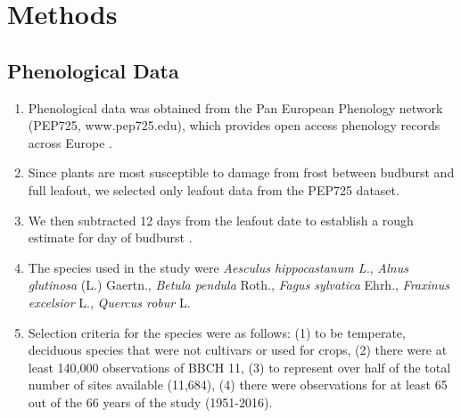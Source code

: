 \documentclass{article}\usepackage[]{graphicx}\usepackage[]{color}
\begin{document}

\section*{Methods}
\subsection*{Phenological Data}
\begin{enumerate}
\item Phenological data was obtained from the Pan European Phenology network (PEP725, www.pep725.edu), which provides open access phenology records across Europe \citep{Templ2018}.
\item Since plants are most susceptible to damage from frost between budburst and full leafout, we selected only leafout data \citep[i.e., in][BBCH 11, which is defined as the point of leaf unfolding and the first visible leaf stalk]{Meier2001} from the PEP725 dataset.
\item We then subtracted 12 days from the leafout date to establish a rough estimate for day of budburst \citep{Donnelly2017}. 
\item The species used in the study were \textit{Aesculus hippocastanum L.}, \textit{Alnus glutinosa} (L.) Gaertn., \textit{Betula pendula} Roth., \textit{Fagus sylvatica} Ehrh., \textit{Fraxinus excelsior} L., \textit{Quercus robur} L.
\item Selection criteria for the species were as follows: (1) to be temperate, deciduous species that were not cultivars or used for crops, (2) there were at least 140,000 observations of BBCH 11, (3) to represent over half of the total number of sites available (11,684), (4) there were observations for at least 65 out of the 66 years of the study (1951-2016). %
\end{enumerate}
\end{document}
